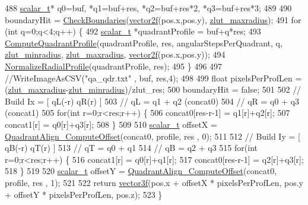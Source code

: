 \begin{DoxyCode}
488     \hyperlink{scalar__types_8h_a03fcef84665498b9cfcf9c7cc25574e9}{scalar\_t}* q0=buf, *q1=buf+res, *q2=buf+res*2, *q3=buf+res*3;
489 
490     boundaryHit = \hyperlink{class_c_p_u_tracker_a7d853e9c7142eefcbd227f18c05b60e7}{CheckBoundaries}(\hyperlink{std__incl_8h_aba974726076ec2d63a67114c536d123e}{vector2f}(pos.x,pos.y), 
      \hyperlink{class_c_p_u_tracker_aac96fa28c0ee4462e176e78c9ec91335}{zlut\_maxradius});
491     \textcolor{keywordflow}{for} (\textcolor{keywordtype}{int} q=0;q<4;q++) \{
492         \hyperlink{scalar__types_8h_a03fcef84665498b9cfcf9c7cc25574e9}{scalar\_t} *quadrantProfile = buf+q*res;
493         \hyperlink{class_c_p_u_tracker_a96cc7e3d9d65226c8aa718b4bb03a633}{ComputeQuadrantProfile}(quadrantProfile, res, angularStepsPerQuadrant, q, 
      \hyperlink{class_c_p_u_tracker_a18ed4e4c7e10ea5728eaf4d36b864fdc}{zlut\_minradius}, \hyperlink{class_c_p_u_tracker_aac96fa28c0ee4462e176e78c9ec91335}{zlut\_maxradius}, \hyperlink{std__incl_8h_aba974726076ec2d63a67114c536d123e}{vector2f}(pos.x,pos.y));
494         \hyperlink{utils_8cpp_a404fa660440d30ed70566aebf9f9e94a}{NormalizeRadialProfile}(quadrantProfile, res);
495     \}
496     
497     \textcolor{comment}{//WriteImageAsCSV("qa\_qdr.txt" , buf, res,4);}
498     
499     \textcolor{keywordtype}{float} pixelsPerProfLen = (\hyperlink{class_c_p_u_tracker_aac96fa28c0ee4462e176e78c9ec91335}{zlut\_maxradius}-\hyperlink{class_c_p_u_tracker_a18ed4e4c7e10ea5728eaf4d36b864fdc}{zlut\_minradius})/zlut\_res;
500     boundaryHit = \textcolor{keyword}{false};
501 
502     \textcolor{comment}{// Build Ix = [ qL(-r)  qR(r) ]}
503     \textcolor{comment}{// qL = q1 + q2   (concat0)}
504     \textcolor{comment}{// qR = q0 + q3   (concat1)}
505     \textcolor{keywordflow}{for}(\textcolor{keywordtype}{int} r=0;r<res;r++) \{
506         concat0[res-r-1] = q1[r]+q2[r];
507         concat1[r] = q0[r]+q3[r];
508     \}
509 
510     \hyperlink{scalar__types_8h_a03fcef84665498b9cfcf9c7cc25574e9}{scalar\_t} offsetX = \hyperlink{class_c_p_u_tracker_a71992f53900219b3c62bf559b9e28980}{QuadrantAlign\_ComputeOffset}(concat0, profile, res
      , 0);
511 
512     \textcolor{comment}{// Build Iy = [ qB(-r)  qT(r) ]}
513     \textcolor{comment}{// qT = q0 + q1}
514     \textcolor{comment}{// qB = q2 + q3}
515     \textcolor{keywordflow}{for}(\textcolor{keywordtype}{int} r=0;r<res;r++) \{
516         concat1[r] = q0[r]+q1[r];
517         concat0[res-r-1] = q2[r]+q3[r];
518     \}
519         
520     \hyperlink{scalar__types_8h_a03fcef84665498b9cfcf9c7cc25574e9}{scalar\_t} offsetY = \hyperlink{class_c_p_u_tracker_a71992f53900219b3c62bf559b9e28980}{QuadrantAlign\_ComputeOffset}(concat0, profile, res
      , 1);
521 
522     \textcolor{keywordflow}{return} \hyperlink{std__incl_8h_a2feaef1d85a74bd5cf80df91b1a9a914}{vector3f}(pos.x + offsetX * pixelsPerProfLen, pos.y + offsetY * pixelsPerProfLen, pos.z);
523 \}
\end{DoxyCode}
